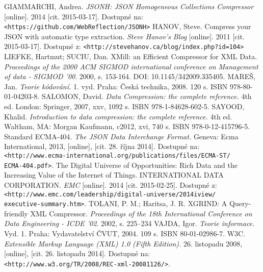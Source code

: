 \begin{thebibliography}{99}
 GIAMMARCHI, Andrea. {\em JSONH: JSON Homogeneous Collections Compressor} [online]. 2014 [cit. 2015-03-17]. Dostupné na: {\tt <https://github.com/WebReflection/JSONH>}
 HANOV, Steve. Compress your JSON with automatic type extraction. {\em Steve Hanov's Blog} [online]. 2011 [cit. 2015-03-17]. Dostupné z: {\tt <http://stevehanov.ca/blog/index.php?id=104>}
 LIEFKE, Hartmut; SUCIU, Dan. XMill: an Efficient Compressor for XML Data. {\em Proceedings of the 2000 ACM SIGMOD international conference on Management of data - SIGMOD '00}. 2000, s. 153-164. DOI: 10.1145/342009.335405.
 MAREŠ, Jan. {\em Teorie kódování.} 1. vyd. Praha: Česká technika, 2008. 120 s. ISBN 978-80-01-04203-8.
 SALOMON, David. {\em Data Compression: the complete reference.} 4th ed. London: Springer, 2007, xxv, 1092 s. ISBN 978-1-84628-602-5.
	SAYOOD, Khalid. {\em Introduction to data compression: the complete reference.} 4th ed. Waltham, MA: Morgan Kaufmann, c2012, xvi, 740 s. ISBN 978-0-12-415796-5.
 Standard ECMA-404. {\em The JSON Data Interchange Format.} Geneva: Ecma International, 2013, [online], [cit. 28. října 2014]. Dostupné na: {\tt <http://www.ecma-international.org/publications/files/ECMA-ST/\\ECMA-404.pdf>}.
 The Digital Universe of Opportunities: Rich Data and the Increasing Value of the Internet of Things. INTERNATIONAL DATA CORPORATION. {\em EMC} [online]. 2014 [cit. 2015-02-25]. Dostupné z: {\tt <http://www.emc.com/leadership/digital-universe/2014iview/\\executive-summary.htm>}.
 TOLANI, P. M.; Haritsa, J. R. XGRIND: A Query-friendly XML Compressor. {\em Proceedings of the 18th International Conference on Data Engineering - ICDE ’02}. 2002, s. 225--234
 VAJDA, Igor. {\em Teorie informace.} Vyd. 1. Praha: Vydavatelství ČVUT, 2004. 109 s. ISBN 80-01-02986-7.
 W3C. {\em Extensible Markup Language (XML) 1.0 (Fifth Edition).} 26. listopadu 2008, [online], [cit. 26. listopadu 2014]. Dostupné na: {\tt <http://www.w3.org/TR/2008/REC-xml-20081126/>}.
\end{thebibliography}
